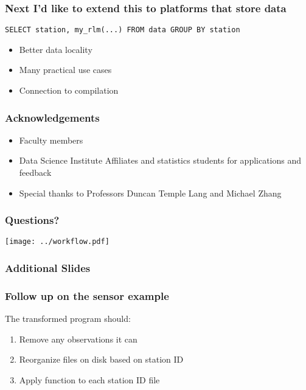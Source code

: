 \documentclass{beamer}
\begin{document}
\begin{frame}[fragile]

\frametitle{Next I'd like to extend this to platforms that store data}


\begin{verbatim}
SELECT station, my_rlm(...) FROM data GROUP BY station
\end{verbatim}

\begin{itemize}
    \item Better data locality
    \item Many practical use cases
    \item Connection to compilation
\end{itemize}

\end{frame}
\begin{frame}

    \frametitle{Acknowledgements}

\begin{itemize}
    \item Faculty members
    \item Data Science Institute Affiliates and statistics students for
        applications and feedback
    \item Special thanks to Professors Duncan Temple Lang and Michael Zhang
\end{itemize}

\end{frame}
\begin{frame}

    \frametitle{Questions?}
    \centerline{\texttt{[image: ../workflow.pdf]}}

\end{frame}
\begin{frame}

    \frametitle{Additional Slides}

\end{frame}
\begin{frame}

    \frametitle{Follow up on the sensor example}

    The transformed program should:

\begin{enumerate}
    \item Remove any observations it can
    \item Reorganize files on disk based on station ID
    \item Apply function to each station ID file
\end{enumerate}

\end{frame}
\end{document}
